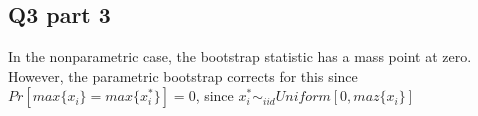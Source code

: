 \documentclass[11pt]{article}
\begin{document}
\subsection{Q3 part 3}
In the nonparametric case, the bootstrap statistic has a mass point at zero. However, the parametric bootstrap corrects for this since $Pr[max\{x_i\} = max\{x_i^*\}] = 0$, since $x_i^* \sim_{iid} Uniform[0,maz\{x_i\}]$
\end{document}
